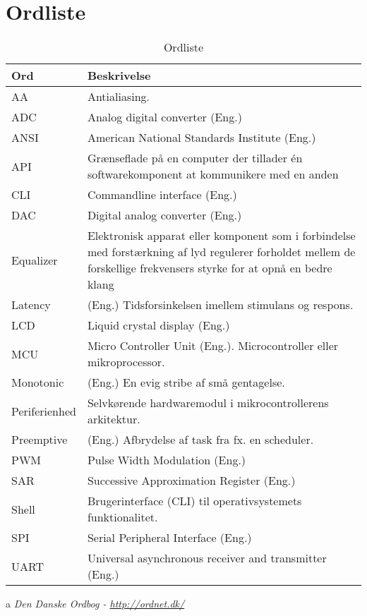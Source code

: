 \chapter{Ordliste} \label{bilag:ordliste}

\begin{table}[h!]
	\caption{Ordliste}
	\label{tab:ordliste}
	\begin{threeparttable}
		\begin{tabular}{l p{}}
			\toprule
			\textbf{Ord}      & \textbf{Beskrivelse}   \\ 
			\midrule
			AA			& Antialiasing.\\
			ADC			& Analog digital converter (Eng.)\\
			ANSI		& American National Standards Institute (Eng.)\\
			API			& Grænseflade på en computer der tillader én softwarekomponent at kommunikere med en anden\tnote{a}\\
			CLI			& Commandline interface (Eng.)\\
			DAC			& Digital analog converter (Eng.)\\
			Equalizer 	& Elektronisk apparat eller komponent som i forbindelse med forstærkning af lyd regulerer forholdet mellem de forskellige frekvensers styrke for at opnå en bedre klang \tnote{a} \\
			Latency		& (Eng.) Tidsforsinkelsen imellem stimulans og respons.\\ 
			LCD			& Liquid crystal display (Eng.) \\
			MCU       	& Micro Controller Unit (Eng.). Microcontroller eller mikroprocessor. \\
			Monotonic 	& (Eng.) En evig stribe af små gentagelse.  \tnote{a}\\
			Periferienhed & Selvkørende hardwaremodul i mikrocontrollerens arkitektur.\\
			Preemptive	& (Eng.) Afbrydelse af task fra fx. en scheduler.\\
			PWM			& Pulse Width Modulation (Eng.) \\
			SAR			& Successive Approximation Register (Eng.)\\
			Shell		& Brugerinterface (CLI) til operativsystemets funktionalitet.\\
			SPI			& Serial Peripheral Interface (Eng.)  \\
			UART		& Universal asynchronous receiver and transmitter (Eng.)\\
			\bottomrule
		\end{tabular}
	
		\begin{tablenotes}
			\item[a] \textit{Den Danske Ordbog - \url{http://ordnet.dk/}}
		\end{tablenotes}
	\end{threeparttable}
\end{table}
